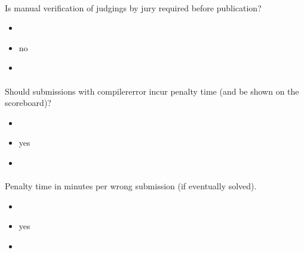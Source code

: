 \documentclass[a4paper,10pt,english,openany]{sphinxmanual}
\begin{document}
\paragraph{}
\label{\detokenize{configuration-reference:verification-required}}
\sphinxAtStartPar
Is manual verification of judgings by jury required before publication?
\begin{itemize}
\item {} 
\sphinxAtStartPar
{} 

\item {} 
\sphinxAtStartPar
{} no

\item {} 
\sphinxAtStartPar
{} 

\end{itemize}


\paragraph{}
\label{\detokenize{configuration-reference:compile-penalty}}
\sphinxAtStartPar
Should submissions with compiler\sphinxhyphen{}error incur penalty time (and be shown on the scoreboard)?
\begin{itemize}
\item {} 
\sphinxAtStartPar
{} 

\item {} 
\sphinxAtStartPar
{} yes

\item {} 
\sphinxAtStartPar
{} 

\end{itemize}


\paragraph{}
\label{\detokenize{configuration-reference:penalty-time}}
\sphinxAtStartPar
Penalty time in minutes per wrong submission (if eventually solved).
\begin{itemize}
\item {} 
\sphinxAtStartPar
{} 

\item {} 
\sphinxAtStartPar
{} yes

\item {} 
\sphinxAtStartPar
{} 

\end{itemize}
\end{document}
